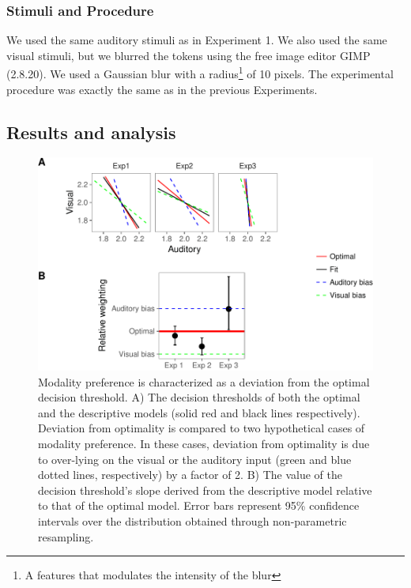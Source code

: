 \documentclass[english,floatsintext,man]{apa6}
\theoremstyle{definition}
\theoremstyle{definition}
\theoremstyle{definition}
\theoremstyle{remark}
\begin{document}
\subsubsection{Stimuli and Procedure}\label{stimuli-and-procedure-1}

We used the same auditory stimuli as in Experiment 1. We also used the
same visual stimuli, but we blurred the tokens using the free image
editor GIMP (2.8.20). We used a Gaussian blur with a
radius\footnote{A features that modulates the intensity of the blur} of
10 pixels. The experimental procedure was exactly the same as in the
previous Experiments.

\subsection{Results and analysis}\label{results-and-analysis-2}

\begin{figure}[!h]
\includegraphics[width=\textwidth]{ms_files/figure-latex/bias-1} \caption{Modality preference is characterized as a deviation from the optimal decision threshold. A) The decision thresholds of both the optimal and the descriptive models (solid red and black lines respectively). Deviation from optimality is compared to two hypothetical cases of modality preference. In these cases, deviation from  optimality is due to over-lying on the visual or the auditory input (green and blue dotted lines, respectively) by a factor of 2. B) The value of the decision threshold's slope derived from the descriptive model relative to that of the optimal model. Error bars represent 95\% confidence intervals over the distribution obtained through non-parametric resampling.}\label{fig:bias}
\end{figure}
\end{document}
